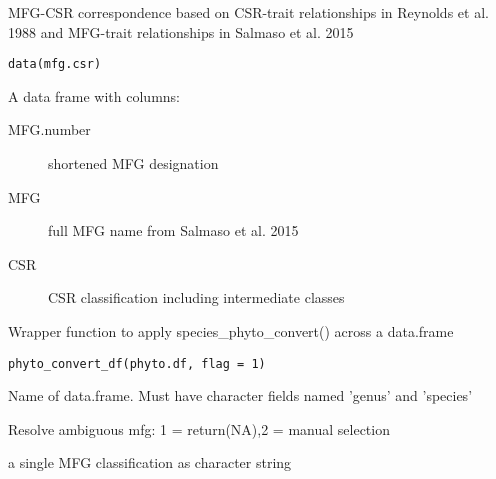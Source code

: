 \documentclass[a4paper]{book}
\begin{document}
%
\begin{Description}\relax
MFG-CSR correspondence based on CSR-trait relationships in Reynolds et al. 1988
and MFG-trait relationships in Salmaso et al. 2015
\end{Description}
%
\begin{Usage}
\begin{verbatim}
data(mfg.csr)
\end{verbatim}
\end{Usage}
%
\begin{Format}
A data frame with columns:
\begin{description}

\item[MFG.number] shortened MFG designation
\item[MFG] full MFG name from Salmaso et al. 2015
\item[CSR] CSR classification including intermediate classes

\end{description}
\end{Format}
%
\begin{Description}\relax
Wrapper function to apply species\_phyto\_convert() across a data.frame
\end{Description}
%
\begin{Usage}
\begin{verbatim}
phyto_convert_df(phyto.df, flag = 1)
\end{verbatim}
\end{Usage}
%
\begin{Arguments}
\begin{ldescription}
\item[\code{phyto.df}] Name of data.frame. Must have character fields named 'genus' and 'species'

\item[\code{flag}] Resolve ambiguous mfg: 1 = return(NA),2 = manual selection
\end{ldescription}
\end{Arguments}
%
\begin{Value}
a single MFG classification as character string
\end{Value}
\end{document}
